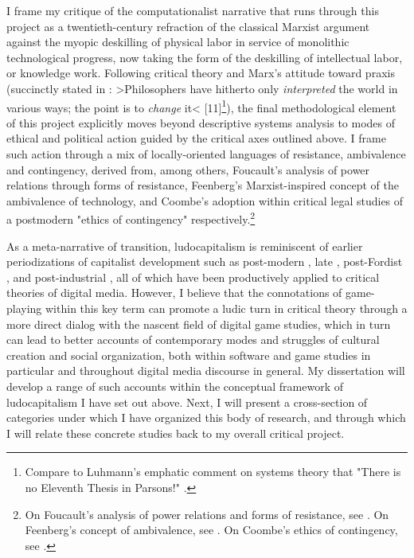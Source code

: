 I frame my critique of the computationalist narrative that runs through this project as a twentieth-century refraction of the classical Marxist argument against the myopic deskilling of physical labor in service of monolithic technological progress, now taking the form of the deskilling of intellectual labor, or knowledge work. Following critical theory and Marx's attitude toward praxis (succinctly stated in : >Philosophers have hitherto only \emph{interpreted} the world in various ways; the point is to \emph{change} it< [11]\footnote{
  Compare to Luhmann's emphatic comment on systems theory that "There is no Eleventh Thesis in Parsons!" \autocite*[129]{Luhmann1994-qz}.
}), the final methodological element of this project explicitly moves beyond descriptive systems analysis to modes of ethical and political action guided by the critical axes outlined above. I frame such action through a mix of locally-oriented languages of resistance, ambivalence and contingency, derived from, among others, Foucault's analysis of power relations through forms of resistance, Feenberg's Marxist-inspired concept of the ambivalence of technology, and Coombe's adoption within critical legal studies of a postmodern "ethics of contingency" respectively.\footnote{
  On Foucault's analysis of power relations and forms of resistance, see \autocite*[780]{Foucault1982-bg}. On Feenberg's concept of ambivalence, see . On Coombe's ethics of contingency, see \autocite[297--9]{Coombe1998-yv}.
}

As a meta-narrative of transition, ludocapitalism is reminiscent of earlier periodizations of capitalist development such as post-modern \autocite{Lyotard1984-kb}, late \autocite{Jameson1990-zi}, post-Fordist \autocites{Amin1994-wf}{Hall1988-ob}, and post-industrial \autocite{Bell1973-pis}, all of which have been productively applied to critical theories of digital media. However, I believe that the connotations of game-playing within this key term can promote a ludic turn in critical theory through a more direct dialog with the nascent field of digital game studies, which in turn can lead to better accounts of contemporary modes and struggles of cultural creation and social organization, both within software and game studies in particular and throughout digital media discourse in general. My dissertation will develop a range of such accounts within the conceptual framework of ludocapitalism I have set out above. Next, I will present a cross-section of categories under which I have organized this body of research, and through which I will relate these concrete studies back to my overall critical project.

